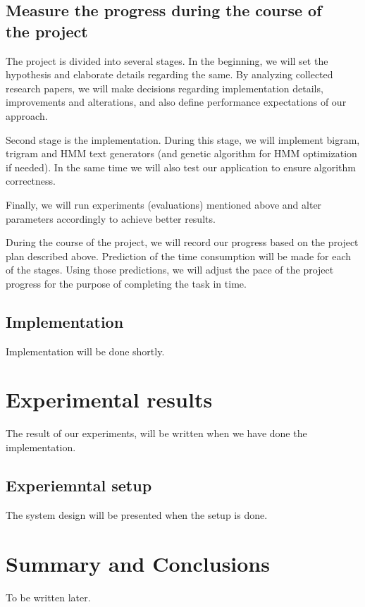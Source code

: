 \documentclass[a4paper,12pt]{article}
\begin{document}
\subsection {Measure the progress during the course of\\ the project}

The project is divided into several stages. In the beginning, we will set the
hypothesis and elaborate details regarding the same. By analyzing collected
research papers, we will make decisions regarding implementation details,
improvements and alterations, and also define performance expectations of our
approach.

Second stage is the implementation. During this stage, we will implement bigram,
trigram and HMM text generators (and genetic algorithm for HMM optimization if
needed). In the same time we will also test our application to ensure algorithm
correctness.

Finally, we will run experiments (evaluations) mentioned above and alter
parameters accordingly to achieve better results.

During the course of the project, we will record our progress based on the
project plan described above. Prediction of the time consumption will be made
for each of the stages. Using those predictions, we will adjust the pace of the
project progress for the purpose of completing the task in time.

\subsection{Implementation}
\label{sec:impl}

Implementation will be done shortly.

\section{Experimental results}
\label{sec:exps}

The result of our experiments, will be written when we have done the implementation.


\subsection{Experiemntal setup}

The system design will be presented when the setup is done.

\section{Summary and Conclusions}
\label{sec:summary}
To be written later.




\end{document}
